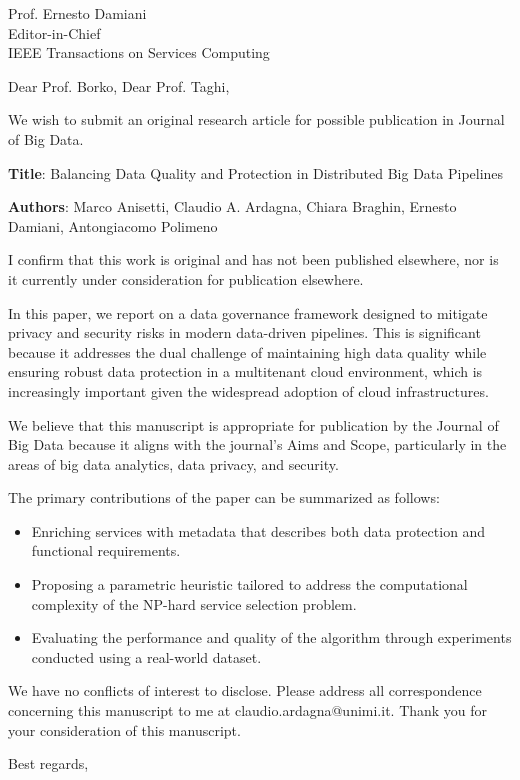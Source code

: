 \documentclass[12pt]{sriletter}
\begin{document}
\begin{letter}{%
        Prof. Ernesto Damiani\\
        Editor-in-Chief\\
        IEEE Transactions on Services Computing\\
    }

    \opening{Dear Prof. Borko, Dear Prof. Taghi,}

    We wish to submit an original research article for possible publication in Journal of Big Data.

    \textbf{Title}: Balancing Data Quality and Protection in Distributed Big Data Pipelines

    \textbf{Authors}: Marco Anisetti, Claudio A. Ardagna, Chiara Braghin, Ernesto Damiani, Antongiacomo Polimeno

    I confirm that this work is original and has not been published elsewhere, nor is it currently under consideration for publication elsewhere.

    In this paper, we report on a data governance framework designed to mitigate privacy and security risks in modern data-driven pipelines.
    This is significant because it addresses the dual challenge of maintaining high data quality while ensuring robust data protection in a multitenant cloud environment,
    which is increasingly important given the widespread adoption of cloud infrastructures.

    We believe that this manuscript is appropriate for publication by the Journal of Big Data because it aligns with the journal’s Aims and Scope,
    particularly in the areas of big data analytics, data privacy, and security.

    The primary contributions of the paper can be summarized as follows:
    \begin{itemize}
        \item Enriching services with metadata that describes both data protection and functional requirements.
        \item Proposing a parametric heuristic tailored to address the computational complexity of the NP-hard service selection problem.
        \item Evaluating the performance and quality of the algorithm through experiments conducted using a real-world dataset.
    \end{itemize}

    We have no conflicts of interest to disclose. Please address all correspondence concerning this manuscript to me at claudio.ardagna@unimi.it.
    Thank you for your consideration of this manuscript.


    \closing{Best regards,}

\end{letter}
\end{document}
